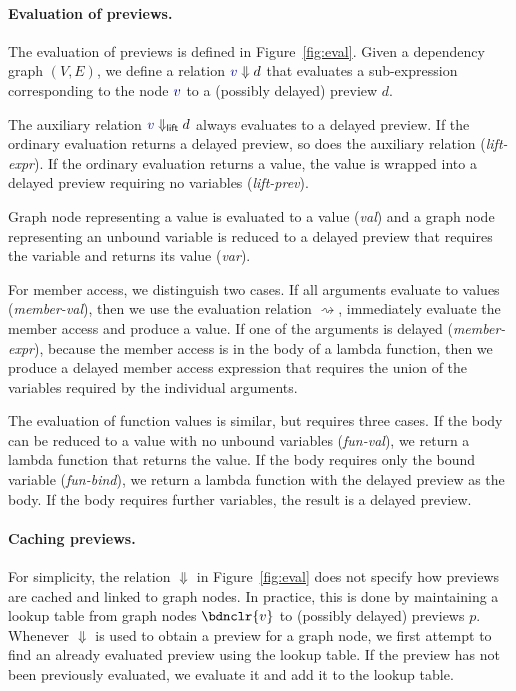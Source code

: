 \documentclass[sigplan,10pt]{acmart}\settopmatter{printfolios=true,printccs=false,printacmref=false}
\theoremstyle{plain}
\theoremstyle{definition}
\newcommand{\ident}[1]{\textnormal{\sffamily #1}}
\newcommand{\bndclr}[1]{\textcolor{kvdclr}{#1}}
\begin{document}
\paragraph{Evaluation of previews.}
The evaluation of previews is defined in Figure~\ref{fig:eval}. Given a dependency graph $(V, E)$,
we define a relation $\bndclr{v}\Downarrow d$ that evaluates a sub-expression corresponding to 
the node $\bndclr{v}$ to a (possibly delayed) preview $d$. 

The auxiliary relation $\bndclr{v}\Downarrow_{\ident{lift}} d$ always evaluates
to a delayed preview. If the ordinary evaluation returns a delayed preview, so does the auxiliary
relation (\emph{lift-expr}). If the ordinary evaluation returns a value, the value is wrapped
into a delayed preview requiring no variables (\emph{lift-prev}).

Graph node representing a value is evaluated to a value (\emph{val}) and a graph node representing
an unbound variable is reduced to a delayed preview that requires the variable and returns its
value (\emph{var}).

For member access, we distinguish two cases. If all arguments evaluate to values (\emph{member-val}),
then we use the evaluation relation $\rightsquigarrow$, immediately evaluate the member access and 
produce a value. If one of the arguments is delayed (\emph{member-expr}), because the member access 
is in the body of a lambda function, then we produce a delayed member access expression that
requires the union of the variables required by the individual arguments.

The evaluation of function values is similar, but requires three cases. If the body can 
be reduced to a value with no unbound variables (\emph{fun-val}), we return a lambda function that
returns the value. If the body requires only the bound variable (\emph{fun-bind}), we return a 
lambda function with the delayed preview as the body. If the body requires further variables,
the result is a delayed preview.

\paragraph{Caching previews.}
For simplicity, the relation $\Downarrow$ in Figure~\ref{fig:eval} does not specify how previews 
are cached and linked to graph nodes. In practice, this is done by maintaining a lookup table
from graph nodes $\bdnclr{v}$ to (possibly delayed) previews $p$.
Whenever $\Downarrow$ is used to obtain a preview for a graph node, we first 
attempt to find an already evaluated preview using the lookup table. If the preview has not
been previously evaluated, we evaluate it and add it to the lookup table.
\end{document}
